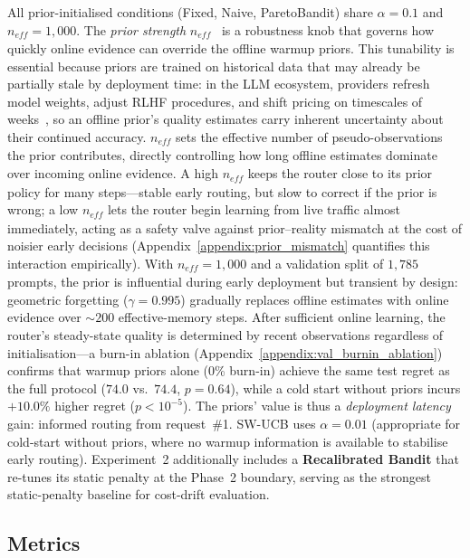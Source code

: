 \noindent
All prior-initialised conditions (Fixed, Naive, ParetoBandit) share
$\alpha{=}0.1$ and $n_\mathit{eff}{=}1{,}000$.
The \emph{prior strength} $n_\mathit{eff}$~\cite{kveton2023warmstart} is a robustness knob that governs how quickly online evidence can override the offline warmup priors.
This tunability is essential because priors are trained on historical data that may already be partially stale by deployment time: in the LLM ecosystem, providers refresh model weights, adjust RLHF procedures, and shift pricing on timescales of weeks~\cite{chen2023chatgptdrift,thompson2026timeline}, so an offline prior's quality estimates carry inherent uncertainty about their continued accuracy.
$n_\mathit{eff}$ sets the effective number of pseudo-observations the prior contributes, directly controlling how long offline estimates dominate over incoming online evidence.
A high $n_\mathit{eff}$ keeps the router close to its prior policy for many steps---stable early routing, but slow to correct if the prior is wrong; a low $n_\mathit{eff}$ lets the router begin learning from live traffic almost immediately, acting as a safety valve against prior--reality mismatch at the cost of noisier early decisions (Appendix~\ref{appendix:prior_mismatch} quantifies this interaction empirically).
With $n_\mathit{eff}{=}1{,}000$ and a validation split of $1{,}785$ prompts, the prior is influential during early deployment but transient by design: geometric forgetting ($\gamma{=}0.995$) gradually replaces offline estimates with online evidence over ${\sim}200$ effective-memory steps.  After sufficient online learning, the router's steady-state quality is determined by recent observations regardless of initialisation---a burn-in ablation (Appendix~\ref{appendix:val_burnin_ablation}) confirms that warmup priors alone (0\% burn-in) achieve the same test regret as the full protocol ($74.0$ vs.\ $74.4$, $p{=}0.64$), while a cold start without priors incurs $+10.0\%$ higher regret ($p < 10^{-5}$).  The priors' value is thus a \emph{deployment latency} gain: informed routing from request~\#1.
SW-UCB uses $\alpha{=}0.01$ (appropriate for cold-start without
priors, where no warmup information is available to stabilise early routing).
Experiment~2 additionally includes a \textbf{Recalibrated Bandit}
that re-tunes its static penalty at the Phase~2 boundary, serving
as the strongest static-penalty baseline for cost-drift evaluation.

\subsection{Metrics}

